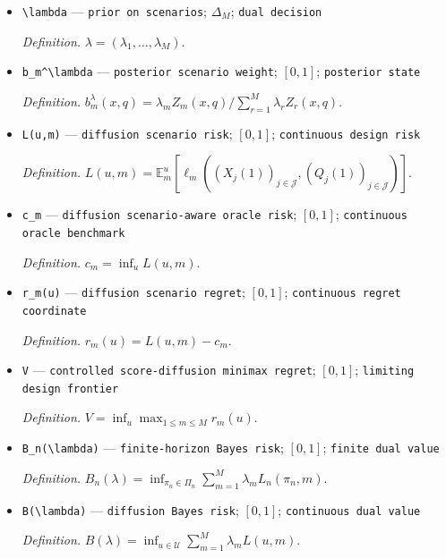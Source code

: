 \documentclass{article}
\begin{document}
\begin{itemize}
  \par\smallskip\noindent\emph{Definition.} \(Z_m(x,q)=\exp\{\sum_{j\in\mathcal J}h_j^m x_j-\tfrac12\sum_{j\in\mathcal J}(h_j^m)^2q_j\}\).
  \item \texttt{\textbackslash{}\allowbreak{}lambda} --- \texttt{prior on scenarios}; \(\Delta_M\); \texttt{dual decision}
  \par\smallskip\noindent\emph{Definition.} \(\lambda=(\lambda_1,\ldots,\lambda_M)\).
  \item \texttt{b\_\allowbreak{}m\textasciicircum{}\textbackslash{}\allowbreak{}lambda} --- \texttt{posterior scenario weight}; \([0,1]\); \texttt{posterior state}
  \par\smallskip\noindent\emph{Definition.} \(b_m^\lambda(x,q)=\lambda_mZ_m(x,q)/\sum_{r=1}^M\lambda_rZ_r(x,q)\).
  \item \texttt{L(u,\allowbreak{}m)} --- \texttt{diffusion scenario risk}; \([0,1]\); \texttt{continuous design risk}
  \par\smallskip\noindent\emph{Definition.} \(L(u,m)=\mathbb E_m^u[\ell_m((X_j(1))_{j\in\mathcal J},(Q_j(1))_{j\in\mathcal J})]\).
  \item \texttt{c\_\allowbreak{}m} --- \texttt{diffusion scenario-\allowbreak{}aware oracle risk}; \([0,1]\); \texttt{continuous oracle benchmark}
  \par\smallskip\noindent\emph{Definition.} \(c_m=\inf_u L(u,m)\).
  \item \texttt{r\_\allowbreak{}m(u)} --- \texttt{diffusion scenario regret}; \([0,1]\); \texttt{continuous regret coordinate}
  \par\smallskip\noindent\emph{Definition.} \(r_m(u)=L(u,m)-c_m\).
  \item \texttt{V} --- \texttt{controlled score-\allowbreak{}diffusion minimax regret}; \([0,1]\); \texttt{limiting design frontier}
  \par\smallskip\noindent\emph{Definition.} \(V=\inf_u\max_{1\leq m\leq M}r_m(u)\).
  \item \texttt{B\_\allowbreak{}n(\textbackslash{}\allowbreak{}lambda)} --- \texttt{finite-\allowbreak{}horizon Bayes risk}; \([0,1]\); \texttt{finite dual value}
  \par\smallskip\noindent\emph{Definition.} \(B_n(\lambda)=\inf_{\pi_n\in\Pi_n}\sum_{m=1}^M\lambda_mL_n(\pi_n,m)\).
  \item \texttt{B(\textbackslash{}\allowbreak{}lambda)} --- \texttt{diffusion Bayes risk}; \([0,1]\); \texttt{continuous dual value}
  \par\smallskip\noindent\emph{Definition.} \(B(\lambda)=\inf_{u\in\mathcal U}\sum_{m=1}^M\lambda_mL(u,m)\).

\end{itemize}
\end{document}

